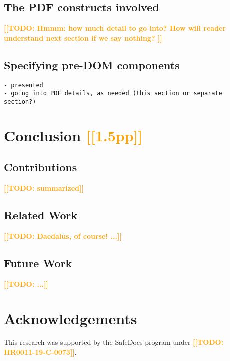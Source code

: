 \documentclass[conference,11pt]{IEEEtran}
\newcommand{\note}[1]{\noteYes{#1}}
\newcommand{\noteYes}[1]{\textbf{\textcolor{orange}{[[#1]]}}}
\newcommand{\todo}[1]{\note{TODO: #1}}
\begin{document}
\subsection{The PDF constructs involved}
\todo{Hmmm: how much detail to go into?
      How will reader understand next section if we say nothing?
}

\subsection{Specifying pre-DOM components}
\begin{lstlisting}
- presented
- going into PDF details, as needed (this section or separate section?)
\end{lstlisting}

\section{Conclusion \note{1.5pp}}
\label{sec:conclusion}

\subsection{Contributions}
\todo{summarized}
      
\subsection{Related Work}
\todo{Daedalus, of course! ...}
      
\subsection{Future Work}
\todo{...}


\section*{Acknowledgements}

This research was supported by the SafeDocs program under \todo{HR0011-19-C-0073}.




% 
\end{document}
